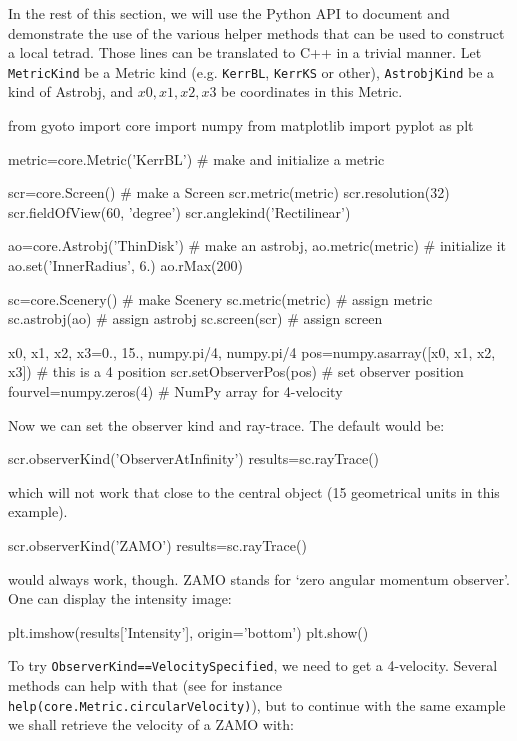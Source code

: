 \documentclass[a4paper,12pt]{article}
\begin{document}
In the rest of this section, we will use the Python API to document
and demonstrate the use of the various helper methods that can be used
to construct a local tetrad. Those lines can be translated to C++ in a
trivial manner. Let \texttt{MetricKind} be a Metric kind
(e.g. \texttt{KerrBL}, \texttt{KerrKS} or other), \texttt{AstrobjKind}
be a kind of Astrobj, and $x0, x1, x2, x3$ be coordinates in this
Metric.
\begin{code}
  from gyoto import core
  import numpy
  from matplotlib import pyplot as plt

  metric=core.Metric('KerrBL')        # make and initialize a metric

  scr=core.Screen()                   # make a Screen
  scr.metric(metric)
  scr.resolution(32)
  scr.fieldOfView(60, 'degree')
  scr.anglekind('Rectilinear')

  ao=core.Astrobj('ThinDisk')         # make an astrobj,
  ao.metric(metric)                   # initialize it
  ao.set('InnerRadius', 6.)
  ao.rMax(200)

  sc=core.Scenery()                   # make Scenery
  sc.metric(metric)                   # assign metric
  sc.astrobj(ao)                      # assign astrobj
  sc.screen(scr)                      # assign screen
  
  x0, x1, x2, x3=0., 15., numpy.pi/4, numpy.pi/4
  pos=numpy.asarray([x0, x1, x2, x3]) # this is a 4 position
  scr.setObserverPos(pos)             # set observer position
  fourvel=numpy.zeros(4)              # NumPy array for 4-velocity
\end{code}

Now we can set the observer kind and ray-trace. The default would be:
\begin{code}
  scr.observerKind('ObserverAtInfinity')
  results=sc.rayTrace()
\end{code}
which will not work that close to the central object (15 geometrical
units in this example).

\begin{code}
  scr.observerKind('ZAMO')
  results=sc.rayTrace()
\end{code}
would always work, though. ZAMO stands for `zero angular momentum
observer'. One can display the intensity image:

\begin{code}
  plt.imshow(results['Intensity'], origin='bottom')
  plt.show()
\end{code}

To try \texttt{ObserverKind==VelocitySpecified}, we need to get a
4-velocity. Several methods can help with that (see for instance
\texttt{help(core.Metric.circularVelocity)}), but to continue with the
same example we shall retrieve the velocity of a ZAMO with:
\end{document}
